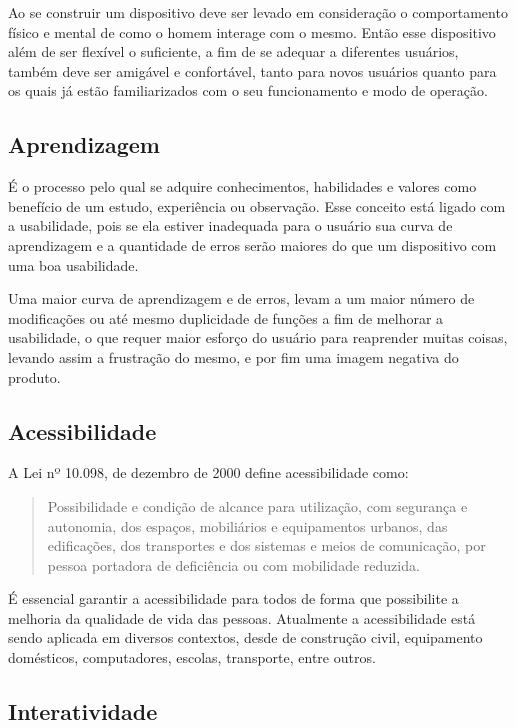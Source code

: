 \documentclass[
	12pt,			%
	openright,		%
	oneside,			%
	a4paper,			%
	chapter=TITLE,		%
	english,			%
	brazil,			%
	]{abntex2}
\begin{document}
Ao se construir um dispositivo deve ser levado em consideração o comportamento físico e mental de como o homem interage com o mesmo. Então esse dispositivo além de ser flexível o suficiente, a fim de se adequar a diferentes usuários, também deve ser amigável e confortável, tanto para novos usuários quanto para os quais já estão familiarizados com o seu funcionamento e modo de operação.

\subsection{Aprendizagem}

É o processo pelo qual se adquire conhecimentos, habilidades e valores como benefício de um estudo, experiência ou observação. Esse conceito está ligado com a usabilidade, pois se ela estiver inadequada para o usuário sua curva de aprendizagem e a quantidade de erros serão maiores do que um dispositivo com uma boa usabilidade.

Uma maior curva de aprendizagem e de erros, levam a um maior número de modificações ou até mesmo duplicidade de funções a fim de melhorar a usabilidade, o que requer maior esforço do usuário para reaprender muitas coisas, levando assim a frustração do mesmo, e por fim uma imagem negativa do produto.

\subsection{Acessibilidade}

A Lei nº 10.098, de dezembro de 2000 define acessibilidade como:

\begin{quote}\small\setlength{\leftskip}{4cm}
Possibilidade e condição de alcance para utilização, com segurança e autonomia, dos espaços, mobiliários e equipamentos urbanos, das edificações, dos transportes e dos sistemas e meios de comunicação, por pessoa portadora de deficiência ou com mobilidade reduzida.
\end{quote}

É essencial garantir a acessibilidade para todos de forma que possibilite a melhoria da qualidade de vida das pessoas. Atualmente a acessibilidade está sendo aplicada em diversos contextos, desde de construção civil, equipamento domésticos, computadores, escolas, transporte, entre outros.

\subsection{Interatividade}
\end{document}
